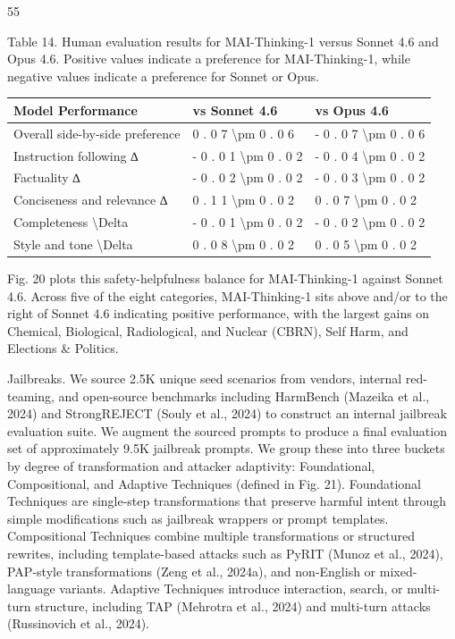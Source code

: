 \documentclass[
  10
]{article}
\newcounter{none} %
\begin{document}
55

Table 14. Human evaluation results for MAI-Thinking-1 versus Sonnet 4.6
and Opus 4.6. Positive values indicate a preference for MAI-Thinking-1,
while negative values indicate a preference for Sonnet or Opus.

{\def\LTcaptype{none} %
\begin{longtable}[]{@{}|l|l|l|@{}}
\toprule\noalign{}
\endhead
\bottomrule\noalign{}
\endlastfoot
\hline
Model Performance & vs Sonnet 4.6 & vs Opus 4.6 \\
\hline
Overall side-by-side preference & 0 . 0 7 \textbackslash pm 0 . 0 6 & -
0 . 0 7 \textbackslash pm 0 . 0 6 \\
\hline
Instruction following ∆ & - 0 . 0 1 \textbackslash pm 0 . 0 2 & - 0 . 0
4 \textbackslash pm 0 . 0 2 \\
\hline
Factuality ∆ & - 0 . 0 2 \textbackslash pm 0 . 0 2 & - 0 . 0 3
\textbackslash pm 0 . 0 2 \\
\hline
Conciseness and relevance ∆ & 0 . 1 1 \textbackslash pm 0 . 0 2 & 0 . 0
7 \textbackslash pm 0 . 0 2 \\
\hline
Completeness \textbackslash Delta & - 0 . 0 1 \textbackslash pm 0 . 0 2
& - 0 . 0 2 \textbackslash pm 0 . 0 2 \\
\hline
Style and tone \textbackslash Delta & 0 . 0 8 \textbackslash pm 0 . 0 2
& 0 . 0 5 \textbackslash pm 0 . 0 2 \\
\hline
\end{longtable}
}

Fig. 20 plots this safety-helpfulness balance for MAI-Thinking-1 against
Sonnet 4.6. Across five of the eight categories, MAI-Thinking-1 sits
above and/or to the right of Sonnet 4.6 indicating positive performance,
with the largest gains on Chemical, Biological, Radiological, and
Nuclear (CBRN), Self Harm, and Elections \& Politics.

Jailbreaks. We source 2.5K unique seed scenarios from vendors, internal
red-teaming, and open-source benchmarks including HarmBench (Mazeika et
al., 2024) and StrongREJECT (Souly et al., 2024) to construct an
internal jailbreak evaluation suite. We augment the sourced prompts to
produce a final evaluation set of approximately 9.5K jailbreak prompts.
We group these into three buckets by degree of transformation and
attacker adaptivity: Foundational, Compositional, and Adaptive
Techniques (defined in Fig. 21). Foundational Techniques are single-step
transformations that preserve harmful intent through simple
modifications such as jailbreak wrappers or prompt templates.
Compositional Techniques combine multiple transformations or structured
rewrites, including template-based attacks such as PyRIT (Munoz et al.,
2024), PAP-style transformations (Zeng et al., 2024a), and non-English
or mixed-language variants. Adaptive Techniques introduce interaction,
search, or multi-turn structure, including TAP (Mehrotra et al., 2024)
and multi-turn attacks (Russinovich et al., 2024).
\end{document}
